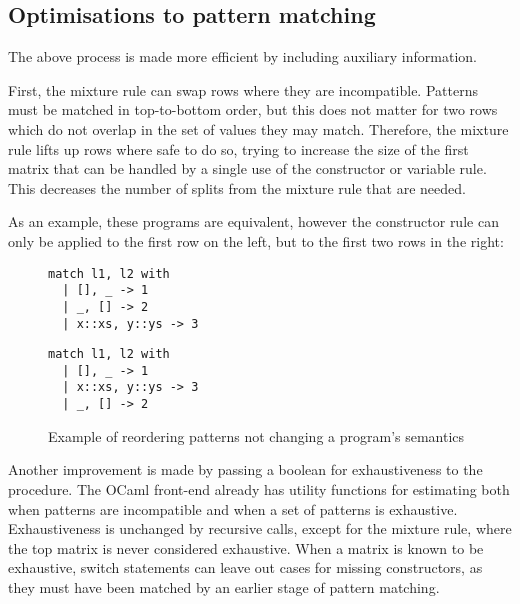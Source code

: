 

\subsection{Optimisations to pattern matching}
The above process is made more efficient by including auxiliary information. %


First, the mixture rule can swap rows where they are incompatible. Patterns must be matched in top-to-bottom order, but this does not matter for two rows which do not overlap in the set of values they may match. Therefore, the mixture rule lifts up rows where safe to do so, trying to increase the size of the first matrix that can be handled by a single use of the constructor or variable rule. This decreases the number of splits from the mixture rule that are needed. 

As an example, these programs are equivalent, however the constructor rule can only be applied to the first row on the left, but to the first two rows in the right:

\begin{figure}[H]
\hfill
\begin{minipage}{0.45\textwidth}
\begin{verbatim}
match l1, l2 with
  | [], _ -> 1
  | _, [] -> 2
  | x::xs, y::ys -> 3
\end{verbatim}
\end{minipage}\qquad
\begin{minipage}{0.45\textwidth}
\begin{verbatim}
match l1, l2 with
  | [], _ -> 1
  | x::xs, y::ys -> 3
  | _, [] -> 2
\end{verbatim}
\end{minipage}\hfill
\caption{Example of reordering patterns not changing a program's semantics}
\end{figure}

Another improvement is made by passing a boolean for exhaustiveness to the procedure. The OCaml front-end already has utility functions for estimating both when patterns are incompatible and when a set of patterns is exhaustive. Exhaustiveness is unchanged by recursive calls, except for the mixture rule, where the top matrix is never considered exhaustive. When a matrix is known to be exhaustive, switch statements can leave out cases for missing constructors, as they must have been matched by an earlier stage of pattern matching. 



